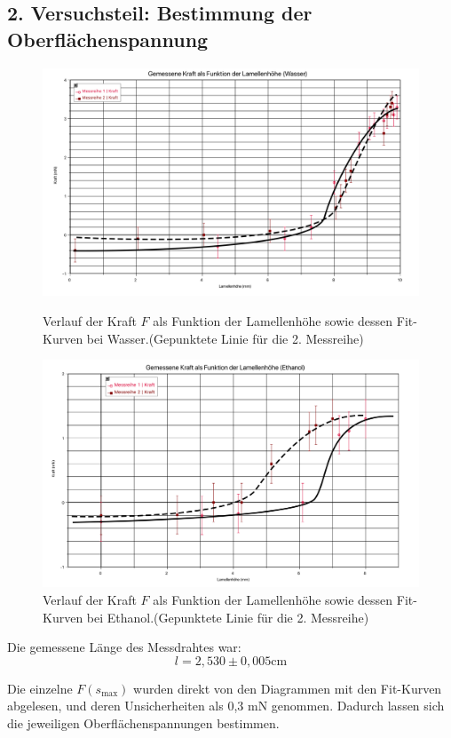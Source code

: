 \documentclass[11pt,a4paper]{article} %
\begin{document}
\subsection{2. Versuchsteil: Bestimmung der Oberflächenspannung}
\newpage
\begin{figure}[h!]
\includegraphics[width=\textwidth]{ex4gr1}
\caption{Verlauf der Kraft $F$ als Funktion der Lamellenhöhe sowie dessen Fit-Kurven bei Wasser.(Gepunktete Linie für die 2. Messreihe)}

\includegraphics[width=\textwidth]{ex4gr2}
\caption{Verlauf der Kraft $F$ als Funktion der Lamellenhöhe sowie dessen Fit-Kurven bei Ethanol.(Gepunktete Linie für die 2. Messreihe)}
\end{figure}
\newpage

Die gemessene Länge des Messdrahtes war:
$$l=2,530 \pm 0,005 \textrm{cm}$$


Die einzelne $F(s_{\textrm{max}})$ wurden direkt von den Diagrammen mit den Fit-Kurven abgelesen, und deren Unsicherheiten als 0,3 \textrm{mN} genommen. Dadurch lassen sich die jeweiligen Oberflächenspannungen bestimmen. 
\end{document}
